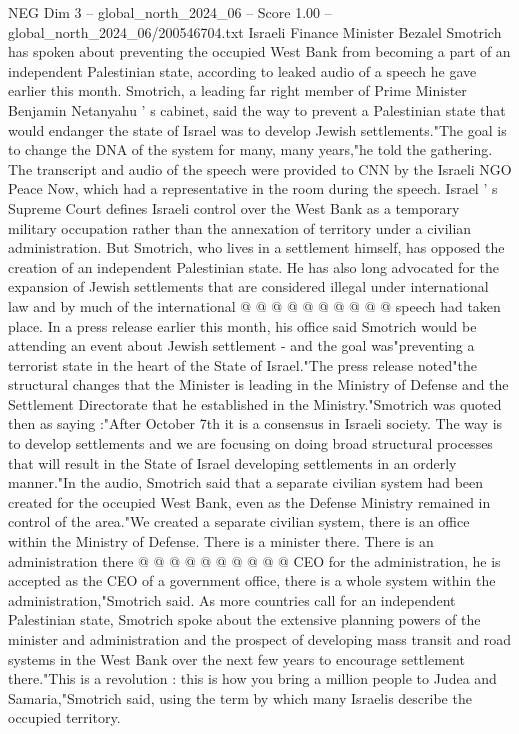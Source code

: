 \begin{textsample}{NEG Dim 3 – global\_north\_2024\_06 – Score 1.00 – global\_north\_2024\_06/200546704.txt}  \label{ex:f3_neg_384}
Israeli Finance Minister Bezalel Smotrich has spoken about preventing the occupied West Bank from becoming a part of an independent Palestinian state, according to leaked audio of a speech he gave earlier this month.
Smotrich, a leading far right member of Prime Minister Benjamin Netanyahu ' s cabinet, said the way to prevent a Palestinian state that would endanger the state of Israel was to develop Jewish settlements."The goal is to change the DNA of the system for many, many years,"he told the gathering.
The transcript and audio of the speech were provided to CNN by the Israeli NGO Peace Now, which had a representative in the room during the speech.
Israel ' s Supreme Court defines Israeli control over the West Bank as a temporary military occupation rather than the annexation of territory under a civilian administration.
But Smotrich, who lives in a settlement himself, has opposed the creation of an independent Palestinian state.
He has also long advocated for the expansion of Jewish settlements that are considered illegal under international law and by much of the international @ @ @ @ @ @ @ @ @ @ speech had taken place.
In a press release earlier this month, his office said Smotrich would be attending an event about Jewish settlement - and the goal was"preventing a terrorist state in the heart of the State of Israel."The press release noted"the structural changes that the Minister is leading in the Ministry of Defense and the Settlement Directorate that he established in the Ministry."Smotrich was quoted then as saying :"After October 7th it is a consensus in Israeli society.
The way is to develop settlements and we are focusing on doing broad structural processes that will result in the State of Israel developing settlements in an orderly manner."In the audio, Smotrich said that a separate civilian system had been created for the occupied West Bank, even as the Defense Ministry remained in control of the area."We created a separate civilian system, there is an office within the Ministry of Defense.
There is a minister there.
There is an administration there @ @ @ @ @ @ @ @ @ @ CEO for the administration, he is accepted as the CEO of a government office, there is a whole system within the administration,"Smotrich said.
As more countries call for an independent Palestinian state, Smotrich spoke about the extensive planning powers of the minister and administration and the prospect of developing mass transit and road systems in the West Bank over the next few years to encourage settlement there."This is a revolution : this is how you bring a million people to Judea and Samaria,"Smotrich said, using the term by which many Israelis describe the occupied territory.

\end{textsample}
